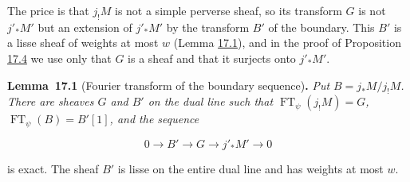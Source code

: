 \documentclass[11pt]{article}
\newenvironment{bpstatement}[2]{\par\addvspace{0.6\baselineskip}\noindent\textbf{#1}#2\textbf{.}\enspace\ignorespaces}
  {\par\addvspace{0.4\baselineskip}}
\newenvironment{bpstatementit}[2]{\begin{bpstatement}{#1}{#2}\itshape\ignorespaces}{\end{bpstatement}}
\begin{document}
The price is that \(j_!M\) is not a simple perverse sheaf, so its transform \(G\) is not \(j'_*M'\) but an extension of \(j'_*M'\) by the transform \(B'\) of the boundary. This \(B'\) is a lisse sheaf of weights at most \(w\) (Lemma \hyperref[bp227]{17.1}), and in the proof of Proposition \hyperref[bp234]{17.4} we use only that \(G\) is a sheaf and that it surjects onto \(j'_*M'\).

\label{bp227}%
\begin{bpstatementit}{Lemma~17.1}{ (Fourier transform of the boundary sequence)}
Put \(B=j_*M/j_!M\). There are sheaves \(G\) and \(B'\) on the dual line such that \(\operatorname{FT}_\psi(j_!M)=G\), \(\operatorname{FT}_\psi(B)=B'[1]\), and the sequence

\[
0\longrightarrow B'\longrightarrow G
\longrightarrow j'_*M'\longrightarrow0
\]

is exact. The sheaf \(B'\) is lisse on the entire dual line and has weights at most \(w\).
\end{bpstatementit}
\end{document}
